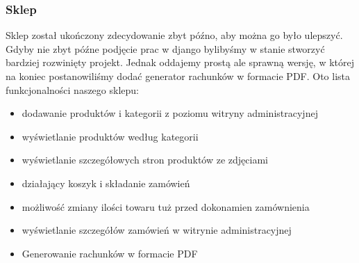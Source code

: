 \documentclass{article}
\begin{document}
\newpage

\subsubsection{Sklep}
\par Sklep został ukończony zdecydowanie zbyt późno, aby można go było ulepszyć. Gdyby nie zbyt późne podjęcie prac w django bylibyśmy w stanie stworzyć bardziej rozwinięty projekt. Jednak oddajemy prostą ale sprawną wersję, w której na koniec postanowiliśmy dodać generator rachunków w formacie PDF. Oto lista funkcjonalności naszego sklepu:
\begin{itemize}
\item dodawanie produktów i kategorii z poziomu witryny administracyjnej
\item wyświetlanie produktów według kategorii
\item wyświetlanie szczegółowych stron produktów ze zdjęciami
\item działający koszyk i składanie zamówień
\item możliwość zmiany ilości towaru tuż przed dokonamien zamównienia
\item wyświetlanie szczegółów zamówień w witrynie administracyjnej
\item Generowanie rachunków w formacie PDF
\end{itemize}
\end{document}
